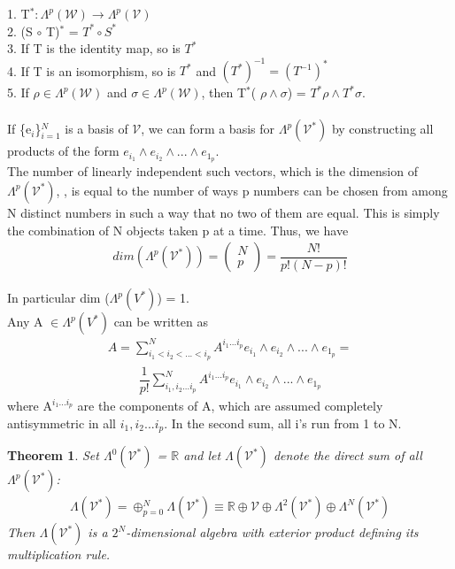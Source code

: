 \documentclass[12pt,a4paper]{article}
\newtheorem{thm}{Theorem}
\begin{document}
1. T$^* : \Lambda^{p} (\mathcal{W}) \to \Lambda^{p} (\mathcal{V})$\\
2. (S $\circ$ T)$^*$ = $T^* \circ S^*$\\
3. If T is the identity map, so is $T^*$\\
4. If T is an isomorphism, so is $T^*$ and $(T^*)^{-1} = (T^{-1})^*$\\
5. If $\rho \in \Lambda^{p} (\mathcal{W})$ and $\sigma \in \Lambda^{p} (\mathcal{W})$, then T$^*$( $\rho \wedge \sigma $) = $T^* \rho \wedge T^* \sigma$.
\\ \\
If \{e$_i$\}$^N_{i=1}$ is a basis of $\mathcal{V}$, we can form a basis for $\Lambda^{p}(\mathcal{V}^*)$ by constructing all products of the form $e_{i_1} \wedge e_{i_2} \wedge ... \wedge e_{1_p}$.  \\The number of linearly independent such vectors, which is the dimension of  $\Lambda^{p}(\mathcal{V}^*)$,  , is equal to the number
of ways p numbers can be chosen from among N distinct numbers in such
a way that no two of them are equal. This is simply the combination of N
objects taken p at a time. Thus, we have \\
\begin{align*}
 dim (\Lambda^{p}(\mathcal{V}^*)) =  
 \begin{pmatrix} N \\ p \end{pmatrix}
  = \dfrac{N!}{p!(N - p)!}
\end{align*}

In particular dim ($\Lambda^{p}(V^*)$) = 1.\\
\indent Any A $\in \Lambda^{p}(V^*)$ can be written as 
\begin{align*}
A = \sum^{N}_{i_1 < i_2 < ... < i_p} A^{i_1...i_p}  e_{i_1} \wedge e_{i_2} \wedge ... \wedge e_{1_p} =
\end{align*}
\begin{align*}
 \dfrac{1}{p!} \sum^{N}_{i_1,i_2 ... i_p} A^{i_1...i_p}  e_{i_1} \wedge e_{i_2} \wedge ... \wedge e_{1_p}
\end{align*}
where A$^{i_1...i_p}$ are the components of A, which are assumed completely antisymmetric in all $i_1,i_2 ... i_p$. In the second sum, all i’s run from 1 to N.\\
\begin{thm}
Set $\Lambda^{0}(\mathcal{V}^*)$ = $\mathbb{R}$ and let $\Lambda(\mathcal{V}^*)$ denote the direct
sum of all  $\Lambda^{p}(\mathcal{V}^*)$:
\begin{align*}
\Lambda(\mathcal{V}^*)  = \oplus^{N}_{p = 0}  \Lambda(\mathcal{V}^*) \equiv \mathbb{R} \oplus \mathcal{V} \oplus \Lambda^{2}(\mathcal{V}^*) \oplus \Lambda^{N}(\mathcal{V}^*)
\end{align*}
Then $\Lambda(\mathcal{V}^*)$ is a $2^N$-dimensional algebra with exterior product defining its multiplication rule.	
\end{thm}
\end{document}
